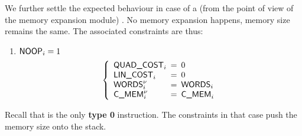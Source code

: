 We further settle the expected behaviour in case of a (from the point of view of the memory expansion module) . No memory expansion happens, memory size remains the same. The associated  constraints are thus:
\begin{enumerate}
	\item \If $\textsf{NOOP}_{i} = 1$ \Then
\[
	\left\{
	\begin{array}{lcl}
		\mxpQuadGas_{i} & \!\!\! = \!\!\! & 0 \\
		\mxpLinGas_{i} & \!\!\! = \!\!\! & 0 \\
		\memSize_{i}\new & \!\!\! = \!\!\! & \memSize_{i} \\
		\expCost\new_{i} & \!\!\! = \!\!\! & \expCost_{i} \\
	\end{array}
	\right.
\]
\end{enumerate}
Recall that  is the only \textbf{type 0} instruction. The constraints in that case push the memory size onto the stack.
